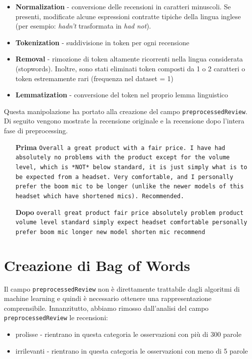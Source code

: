 \begin{itemize}
    \item \textbf{Normalization} - conversione delle recensioni in caratteri minuscoli. Se presenti, modificate alcune espressioni contratte tipiche della lingua inglese (per esempio: \textit{hadn't} trasformata in \textit{had not}).
    \item \textbf{Tokenization} - suddivisione in token per ogni recensione
    \item \textbf{Removal} - rimozione di token altamente ricorrenti nella lingua considerata (stopwords). Inoltre, sono stati eliminati token composti da 1 o 2 caratteri o token estremamente rari (frequenza nel dataset = 1)
    \item \textbf{Lemmatization} - conversione del token nel proprio lemma linguistico
    
\end{itemize}{}

Questa manipolazione ha portato alla creazione del campo \texttt{preprocessedReview}.
Di seguito vengono mostrate la recensione originale e la recensione dopo l'intera fase di preprocessing.
\par
\begin{itemize}
  \item[\textbf{Prima}] \texttt{Overall a great product with a fair price. I have had absolutely no problems with the product except for the volume level, which is *NOT* below standard, it is just simply what is to be expected from a headset. Very comfortable, and I personally prefer the boom mic to be longer (unlike the newer models of this headset which have shortened mics). Recommended.}
  \item[\textbf{Dopo}] \texttt{overall great product fair price absolutely problem product volume level standard simply expect headset comfortable personally prefer boom mic longer new model shorten mic recommend}
\end{itemize}

\section{Creazione di Bag of Words}
\label{bow}
Il campo \texttt{preprocessedReview} non è direttamente trattabile dagli algoritmi di machine learning e quindi è necessario ottenere una rappresentazione comprensibile. 
Innanzitutto, abbiamo rimosso dall'analisi del campo \texttt{preprocessedReview} le recensioni:
\begin{itemize}
    \item prolisse - rientrano in questa categoria le osservazioni con più di 300 parole
    \item irrilevanti - rientrano in questa categoria le osservazioni con meno di 5 parole
\end{itemize}{}

